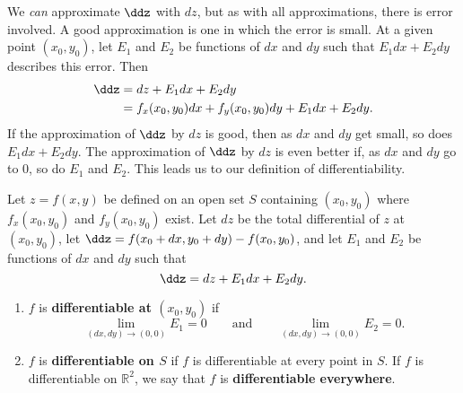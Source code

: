 We \emph{can} approximate $\ddz$ with $dz$, but as with all approximations, there is error involved. A good approximation is one in which the error is small. At a given point $(x_0,y_0)$, let $E_1$ and $E_2$ be functions of $dx$ and $dy$ such that $E_1dx+E_2dy$ describes this error. Then
\begin{align*}
\ddz &= dz + E_1dx+ E_2dy \\
		&= f_x(x_0,y_0)dx+f_y(x_0,y_0)dy + E_1dx+E_2dy.
\end{align*}
If the approximation of $\ddz$ by $dz$ is good, then as $dx$ and $dy$ get small,  so does $E_1dx+E_2dy$. The approximation of $\ddz$ by $dz$ is even better if, as $dx$ and $dy$ go to 0, so do $E_1$ and $E_2$. This leads us to our definition of differentiability.

{Let $z=f(x,y)$ be defined on an open set $S$ containing $(x_0,y_0)$ where $f_x(x_0,y_0)$ and $f_y(x_0,y_0)$ exist. Let $dz$ be the total differential of $z$ at $(x_0,y_0)$, let $\ddz = f(x_0+dx,y_0+dy) - f(x_0,y_0)$, and let $E_1$ and $E_2$ be functions of $dx$ and $dy$  such that 
\[\ddz = dz + E_1dx + E_2dy.\]
\begin{enumerate}
	\item $f$ is \textbf{differentiable at $(x_0,y_0)$} if%
	\[\lim_{(dx,dy)\to(0,0)}E_1=0\qquad\text{and}\qquad\lim_{(dx,dy)\to(0,0)}E_2=0.\]
	\item $f$ is \textbf{differentiable on $S$} if $f$ is differentiable at every point in $S$. If $f$ is differentiable on $\mathbb{R}^2$, we say that $f$ is \textbf{differentiable everywhere}.
\end{enumerate}}

